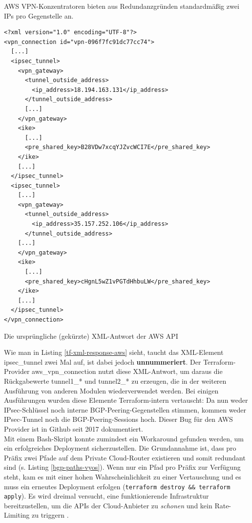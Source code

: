 AWS VPN-Konzentratoren bieten aus Redundanzgründen standardmäßig zwei IPs pro Gegenstelle an. 
\begin{listing}[h]
\begin{verbatim}
<?xml version="1.0" encoding="UTF-8"?>
<vpn_connection id="vpn-096f7fc91dc77cc74">
  [...]
  <ipsec_tunnel>
    <vpn_gateway>
      <tunnel_outside_address>
        <ip_address>18.194.163.131</ip_address>
      </tunnel_outside_address>
      [...]
    </vpn_gateway>
    <ike>
      [...]
      <pre_shared_key>B28VDw7xcqYJZvcWCI7E</pre_shared_key>
    </ike>
    [...]
  </ipsec_tunnel>
  <ipsec_tunnel>
    [...]
    <vpn_gateway>
      <tunnel_outside_address>
        <ip_address>35.157.252.106</ip_address>
      </tunnel_outside_address>
    [...]
    </vpn_gateway>
    <ike>
      [...]
      <pre_shared_key>cHgnL5wZ1vPGTdHhbuLW</pre_shared_key>
    </ike>
    [...]
  </ipsec_tunnel>
</vpn_connection>

\end{verbatim}
\caption{Die ursprüngliche (gekürzte) XML-Antwort der AWS API}
\label{tf-xml-response-aws}
\end{listing}\FloatBarrier
Wie man in Listing \ref{tf-xml-response-aws} sieht, taucht das XML-Element ipsec\_tunnel zwei Mal auf, ist dabei jedoch \textbf{unnummeriert}.
Der Terraform-Provider aws\_vpn\_connection nutzt diese XML-Antwort, um daraus die Rückgabewerte tunnel1\_* und tunnel2\_* zu erzeugen\cite{awsattributestf2021}, die in der weiteren Ausführung von anderen Modulen wiederverwendet werden. Bei einigen Ausführungen wurden diese Elemente Terraform-intern vertauscht: Da nun weder IPsec-Schlüssel noch interne BGP-Peering-Gegenstellen stimmen, kommen weder IPsec-Tunnel noch die BGP-Peering-Sessions hoch. Dieser Bug für den AWS Provider ist in Github seit 2017 dokumentiert\cite{githubbugtf2021}.\\
Mit einem Bash-Skript konnte zumindest ein Workaround gefunden werden, um ein erfolgreiches \gls{Deployment} sicherzustellen. Die Grundannahme ist, dass pro Präfix zwei Pfade auf dem Private Cloud-Router existieren und somit redundant sind (s. Listing \ref{bgp-paths-vyos}). Wenn nur ein Pfad pro Präfix zur Verfügung steht, kam es mit einer hohen Wahrscheinlichkeit zu einer Vertauschung und es muss ein erneutes \gls{Deployment} erfolgen (\texttt{terraform destroy \&\& terraform apply}). Es wird dreimal versucht, eine funktionierende Infrastruktur bereitzustellen, um die APIs der Cloud-Anbieter zu \textit{schonen} und kein Rate-Limiting zu triggern \cite{awsthrottling2021}.
